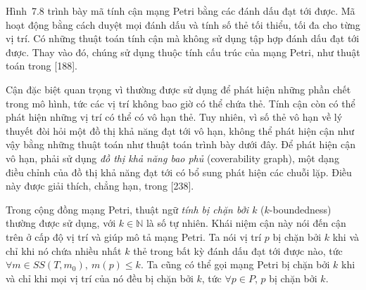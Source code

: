 Hình~7.8 trình bày mã tính cận mạng Petri bằng các đánh dấu đạt tới được. Mã hoạt động bằng cách duyệt mọi đánh dấu và tính số thẻ tối thiểu, tối đa cho từng vị trí. Có những thuật toán tính cận mà không sử dụng tập hợp đánh dấu đạt tới được. Thay vào đó, chúng sử dụng thuộc tính cấu trúc của mạng Petri, như thuật toán trong [188].

Cận đặc biệt quan trọng vì thường được sử dụng để phát hiện những phần chết trong mô hình, tức các vị trí không bao giờ có thể chứa thẻ. Tính cận còn có thể phát hiện những vị trí có thể có vô hạn thẻ. Tuy nhiên, vì số thẻ vô hạn về lý thuyết đòi hỏi một đồ thị khả năng đạt tới vô hạn, không thể phát hiện cận như vậy bằng những thuật toán như thuật toán trình bày dưới đây. Để phát hiện cận vô hạn, phải sử dụng \emph{đồ thị khả năng bao phủ} (coverability graph), một dạng điều chỉnh của đồ thị khả năng đạt tới có bổ sung phát hiện các chuỗi lặp. Điều này được giải thích, chẳng hạn, trong [238].

Trong cộng đồng mạng Petri, thuật ngữ \emph{tính bị chặn bởi $k$} ($k$-boundedness) thường được sử dụng, với $k\in\mathbb{N}$ là số tự nhiên. Khái niệm cận này nói đến cận trên ở cấp độ vị trí và giúp mô tả mạng Petri. Ta nói vị trí $p$ bị chặn bởi $k$ khi và chỉ khi nó chứa nhiều nhất $k$ thẻ trong bất kỳ đánh dấu đạt tới được nào, tức $\forall m\in SS(T,m_0),\ m(p)\leqslant k$. Ta cũng có thể gọi mạng Petri bị chặn bởi $k$ khi và chỉ khi mọi vị trí của nó đều bị chặn bởi $k$, tức $\forall p\in P$, $p$ bị chặn bởi $k$.


